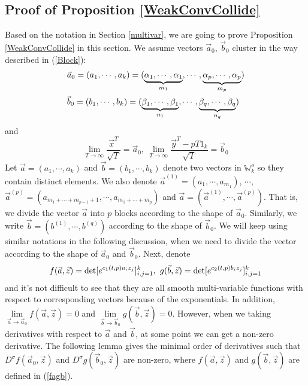 \subsection{Proof of Proposition \ref{WeakConvCollide}}{\label{ProofProp2}}
Based on the notation in Section \ref{multivar}, we are going to prove Proposition \ref{WeakConvCollide} in this section. We assume vectors $\vec{a}_{0}$, $\vec{b}_{0}$ cluster in the way described in (\ref{Block}):
\begin{equation}{\label{a0b0}}
\begin{split}
	&\vec{a}_{0}=(a_{1},\cdots,a_{k})=(\underbrace{\alpha_{1},\cdots,\alpha_{1}}_{m_{1}},\cdots,\underbrace{\alpha_{p},\cdots,\alpha_{p}}_{m_{p}})\\
	&\vec{b}_{0}=(b_{1},\cdots,b_{k})=(\underbrace{\beta_{1},\cdots,\beta_{1}}_{n_{1}},\cdots,\underbrace{\beta_{q},\cdots,\beta_{q}}_{n_{q}})
\end{split}
\end{equation}
and $$\lim_{T\rightarrow\infty}\frac{\vec{x}^{T}}{\sqrt{T}}=\vec{a}_0,\ \lim_{T\rightarrow\infty}\frac{\vec{y}^{T}-pT1_{k}}{\sqrt{T}}=\vec{b}_0$$
Let $\vec{a}=(a_{1},\cdots,a_{k})$ and $\vec{b}=(b_{1},\cdots,b_{k})$ denote two vectors in $\mathbb{W}_{k}^{o}$ so they contain distinct elements. We also denote $\vec{a}^{(1)}=(a_{1},\cdots,a_{m_1})$, $\cdots$, $\vec{a}^{(p)}=(a_{m_1+\cdots+m_{p-1}+1},\cdots, a_{m_1+\cdots+m_{p}})$ and $\vec{a}=(\vec{a}^{(1)},\cdots,\vec{a}^{(p)})$. That is, we divide the vector $\vec{a}$ into $p$ blocks according to the shape of $\vec{a}_0$. Similarly, we write $\vec{b}=(b^{(1)},\cdots,b^{(q)})$ according to the shape of $\vec{b}_0$. We will keep using similar notations in the following discussion, when we need to divide the vector according to the shape of $\vec{a}_0$ and $\vec{b}_0$. Next, denote
\begin{equation}{\label{fagb}}
	f(\vec{a},\vec{z})=\det[e^{c_1(t,p)a_{i}z_{j}}]_{i,j=1}^{k},\ g(\vec{b},\vec{z})=\det[e^{c_2(t,p)b_{i}z_{j}}]_{i,j=1}^{k}
\end{equation}
and it's not difficult to see that they are all smooth multi-variable functions with respect to corresponding vectors because of the exponentials. In addition, $\lim\limits_{\vec{a}\rightarrow\vec{a}_{0}}f(\vec{a},\vec{z})=0$ and $\lim\limits_{\vec{b}\rightarrow\vec{b}_{0}}g(\vec{b},\vec{z})=0$. However, when we taking derivatives with respect to $\vec{a}$ and $\vec{b}$, at some point we can get a non-zero derivative. The following lemma gives the minimal order of derivatives such that $D^{\sigma}f(\vec{a}_0,\vec{z})$ and $D^{\sigma}g(\vec{b}_0,\vec{z})$ are non-zero, where $f(\vec{a},\vec{z})$ and $g(\vec{b},\vec{z})$ are defined in (\ref{fagb}).

